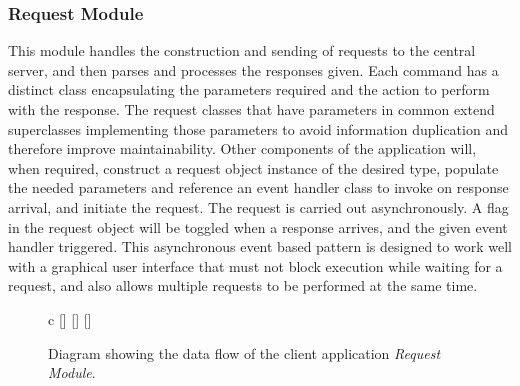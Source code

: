 \subsubsection{Request Module}
This module handles the construction and sending of requests to the central server, and then parses and processes the responses given. Each command has a distinct class encapsulating the parameters required and the action to perform with the response. The request classes that have parameters in common extend superclasses implementing those parameters to avoid information duplication and therefore improve maintainability. Other components of the application will, when required, construct a request object instance of the desired type, populate the needed parameters and reference an event handler class to invoke on response arrival, and initiate the request. The request is carried out asynchronously. A flag in the request object will be toggled when a response arrives, and the given event handler triggered. This asynchronous event based pattern is designed to work well with a graphical user interface that must not block execution while waiting for a request, and also allows multiple requests to be performed at the same time.

\begin{figure}[h!]
    \centering
    \begin{tabular}{c}
        []
        \hspace{2cm}
        []
        \hspace{1cm}
        []\\[2cm]
    \end{tabular}
    {\small
         
    }
    \caption{Diagram showing the data flow of the client application \emph{Request Module}.}
\end{figure}

